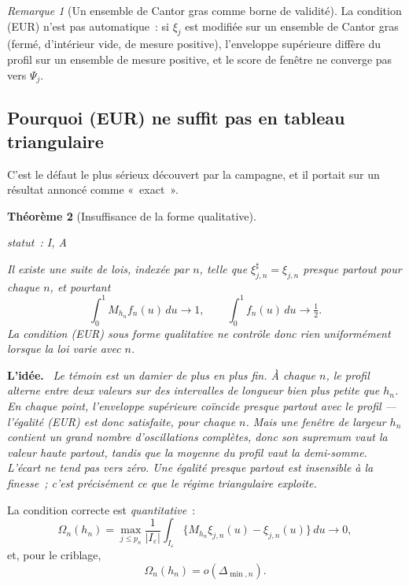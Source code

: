 \documentclass[11pt]{article}
\theoremstyle{plain}
\newtheorem{theoreme}{Théorème}[section]
\theoremstyle{definition}
\theoremstyle{remark}
\newtheorem{remarque}[theoreme]{Remarque}
\newcommand{\1}{\mathbf 1}
\newcommand{\I}{I_\varepsilon}
\newcommand{\statut}[1]{%
  \nopagebreak\par\nopagebreak
  \hfill{\normalfont\footnotesize\textcolor{gris}{statut~: #1}}%
  \par\nopagebreak\vspace{-2pt}}
\newenvironment{idee}
  {\par\medskip\noindent\textcolor{bleu}{\textbf{L'idée.}}\ \itshape}
  {\par\medskip}
\begin{document}
\begin{remarque}[Un ensemble de Cantor gras comme borne de validité]
La condition (EUR) n'est pas automatique~: si $\xi_j$ est modifiée sur un
ensemble de Cantor gras (fermé, d'intérieur vide, de mesure positive),
l'enveloppe supérieure diffère du profil sur un ensemble de mesure
positive, et le score de fenêtre ne converge pas vers $\Psi_j$.
\end{remarque}

\subsection{Pourquoi (EUR) ne suffit pas en tableau triangulaire}

C'est le défaut le plus sérieux découvert par la campagne, et il portait
sur un résultat annoncé comme «~exact~».

\begin{theoreme}[Insuffisance de la forme qualitative]
\label{thm:damier}
\statut{I, A}
Il existe une suite de lois, indexée par $n$, telle que
$\xi^\sharp_{j,n}=\xi_{j,n}$ presque partout \emph{pour chaque $n$}, et
pourtant
\[
 \int_0^1 M_{h_n}f_n(u)\,du\longrightarrow1,
 \qquad
 \int_0^1 f_n(u)\,du\longrightarrow\tfrac12 .
\]
La condition (EUR) sous forme qualitative ne contrôle donc rien
uniformément lorsque la loi varie avec $n$.
\end{theoreme}

\begin{idee}
Le témoin est un \emph{damier de plus en plus fin}. À chaque $n$, le
profil alterne entre deux valeurs sur des intervalles de longueur bien
plus petite que $h_n$. En chaque point, l'enveloppe supérieure coïncide
presque partout avec le profil --- l'égalité (EUR) est donc satisfaite,
pour chaque $n$. Mais une fenêtre de largeur $h_n$ contient un grand
nombre d'oscillations complètes, donc son supremum vaut la valeur haute
partout, tandis que la moyenne du profil vaut la demi-somme. L'écart ne
tend pas vers zéro. Une égalité \emph{presque partout} est insensible à
la finesse~; c'est précisément ce que le régime triangulaire exploite.
\end{idee}

\noindent
La condition correcte est \emph{quantitative}~:
\begin{equation}
 \Omega_n(h_n)=\max_{j\le p_n}\frac1{|\I|}\int_{\I}
   \bigl\{M_{h_n}\xi_{j,n}(u)-\xi_{j,n}(u)\bigr\}\,du
 \longrightarrow0,
 \label{eq:omega}
\end{equation}
et, pour le criblage,
\begin{equation}
 \boxed{\ \Omega_n(h_n)=o(\Delta_{\min,n}).\ }
 \label{eq:omega-screen}
\end{equation}
\end{document}
